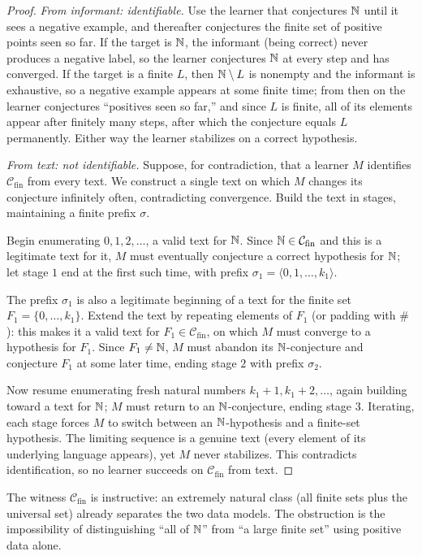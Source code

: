 \begin{proof}
\emph{From informant: identifiable.} Use the learner that conjectures $\mathbb{N}$ until it sees a negative example, and thereafter conjectures the finite set of positive points seen so far. If the target is $\mathbb{N}$, the informant (being correct) never produces a negative label, so the learner conjectures $\mathbb{N}$ at every step and has converged. If the target is a finite $L$, then $\mathbb{N} \setminus L$ is nonempty and the informant is exhaustive, so a negative example appears at some finite time; from then on the learner conjectures ``positives seen so far,'' and since $L$ is finite, all of its elements appear after finitely many steps, after which the conjecture equals $L$ permanently. Either way the learner stabilizes on a correct hypothesis.

\emph{From text: not identifiable.} Suppose, for contradiction, that a learner $M$ identifies $\mathcal{C}_{\mathrm{fin}}$ from every text. We construct a single text on which $M$ changes its conjecture infinitely often, contradicting convergence. Build the text in stages, maintaining a finite prefix $\sigma$.

Begin enumerating $0, 1, 2, \ldots$, a valid text for $\mathbb{N}$. Since $\mathbb{N} \in \mathcal{C}_{\mathrm{fin}}$ and this is a legitimate text for it, $M$ must eventually conjecture a correct hypothesis for $\mathbb{N}$; let stage $1$ end at the first such time, with prefix $\sigma_1 = \langle 0,1,\ldots,k_1\rangle$.

The prefix $\sigma_1$ is also a legitimate beginning of a text for the finite set $F_1 = \{0,\ldots,k_1\}$. Extend the text by repeating elements of $F_1$ (or padding with $\#$): this makes it a valid text for $F_1 \in \mathcal{C}_{\mathrm{fin}}$, on which $M$ must converge to a hypothesis for $F_1$. Since $F_1 \neq \mathbb{N}$, $M$ must abandon its $\mathbb{N}$-conjecture and conjecture $F_1$ at some later time, ending stage $2$ with prefix $\sigma_2$.

Now resume enumerating fresh natural numbers $k_1+1, k_1+2, \ldots$, again building toward a text for $\mathbb{N}$; $M$ must return to an $\mathbb{N}$-conjecture, ending stage $3$. Iterating, each stage forces $M$ to switch between an $\mathbb{N}$-hypothesis and a finite-set hypothesis. The limiting sequence is a genuine text (every element of its underlying language appears), yet $M$ never stabilizes. This contradicts identification, so no learner succeeds on $\mathcal{C}_{\mathrm{fin}}$ from text.
\end{proof}

The witness $\mathcal{C}_{\mathrm{fin}}$ is instructive: an extremely natural class (all finite sets plus the universal set) already separates the two data models. The obstruction is the impossibility of distinguishing ``all of $\mathbb{N}$'' from ``a large finite set'' using positive data alone.

